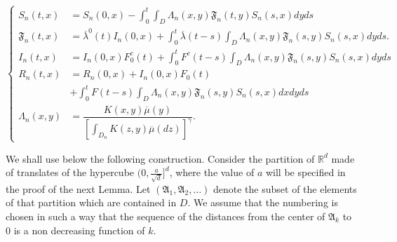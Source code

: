 \documentclass[notitlepage,reqno,11pt]{amsart}
\numberwithin{equation}{section}
\def\R{\mathbb{R}}
\begin{document}
\begin{equation}
\label{syste1}
\left\lbrace
\begin{aligned}
S_{n}(t,x)&= S_{n}(0,x)- \int_0^t\int_{D} \Lambda_{n}(x,y)\mathfrak{F}_{n}(t,y)S_{n}(s,x)dyds\\
\mathfrak{F}_{n}(t,x) &=\overline{\lambda}^0(t)I_{n}(0,x)+\int_0^t\overline{\lambda}(t-s)\int_{D} \Lambda_{n}(x,y)\mathfrak{F}_{n}(s,y)S_{n}(s,x)dyds.\\
I_{n}(t,x)&= I_{n}(0,x)F_0^c(t)+\int_0^t F^c(t-s)\int_{D} \Lambda_{n}(x,y)\mathfrak{F}_{n}(s,y)S_{n}(s,x)dyds\\
R_{n}(t,x)&= R_{n}(0,x)+I_{n}(0,x)F_0(t)\\
&+\int_0^tF(t-s) \int_{D} \Lambda_{n}(x,y)\mathfrak{F}_{n}(s,y)S_{n}(s,x)dxdyds\\
\Lambda_{n}(x,y)&=\dfrac{K(x,y)\overline{\mu}(y)}{\left[\displaystyle\int_{D_{n}}K(z,y)\overline{\mu}(dz) \right]^{\gamma}}.\end{aligned}
\right.
\end{equation}

\bigskip


We shall use below the following construction. Consider the partition of $\R^d$ made of translates of the hypercube $(0,\frac{a}{\sqrt{d}}]^d$, where the value of $a$ will be specified in the proof of the next Lemma.
Let $(\mathfrak{A}_1, \mathfrak{A}_2,\ldots)$ denote the subset of the elements of that partition which are contained in $D$. We assume that the numbering is chosen in such a way that the sequence of the distances from the center of $\mathfrak{A}_k$ to $0$ is a non decreasing function of $k$. 
\end{document}
